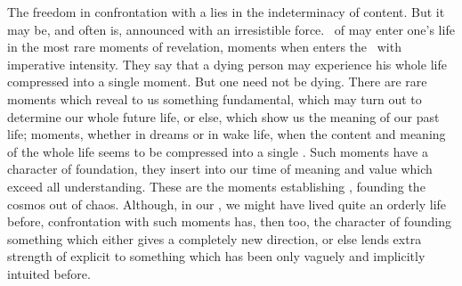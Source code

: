 The freedom in confrontation with a  lies in the indeterminacy of
 content.  But it may be, and often is, announced with an
irresistible force.  \Oss\ of  may enter one's life in the most
rare moments of revelation, moments when  enters the \hoa\ with
imperative intensity.  They say that a dying person may experience his whole
life compressed into a single moment.  But one need not be dying.  There are
rare moments which reveal to us something fundamental,  which
may turn out to determine our whole future life, or else, which show us the
meaning of our past life; moments, whether in dreams or in wake life, when the
content and meaning of the whole life seems to be compressed into a single
.  Such moments have a character of foundation, they insert into our
time  of meaning and value which exceed all 
understanding. These are the moments establishing , founding the
cosmos out of chaos.  Although, in our , we might have lived
quite an orderly life before, confrontation with such moments has, then too, the
character of founding something which either gives a completely new direction,
or else lends extra strength of explicit  to something which has
been only vaguely and implicitly intuited before.




